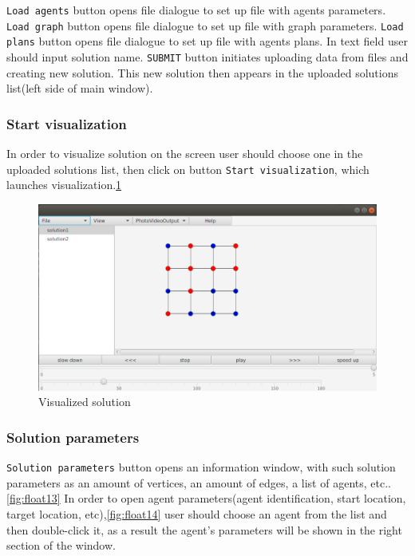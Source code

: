 \documentclass[thesis=B,english]{FITthesis}[2019/12/23]
\begin{document}
\verb|Load agents| button opens file dialogue to set up file with agents parameters. \verb|Load graph| button opens file dialogue to set up file with graph parameters. \verb|Load plans| button opens file dialogue to set up file with agents plans. In text field user should input solution name. \verb|SUBMIT| button initiates uploading data from files and creating new solution. This new solution then appears in the uploaded solutions list(left side of main window). 

\subsubsection{Start visualization}

In order to visualize solution on the screen user should choose one in the uploaded solutions list, then click on button \verb|Start visualization|, which launches visualization.\ref{fig:float12}

\begin{figure}
	\includegraphics[scale=0.34]{solution.png}
	\caption[Start visualization]{Visualized solution}\label{fig:float12}
\end{figure}


\subsubsection{Solution parameters}

\verb|Solution parameters| button opens an information window, with such solution parameters as an amount of vertices, an amount of edges, a list of agents, etc..\ref{fig:float13} In order to open agent parameters(agent identification, start location, target location, etc),\ref{fig:float14} user should choose an agent from the list and then double-click it, as a result the agent's parameters will be shown in the right section of the window.
\end{document}

